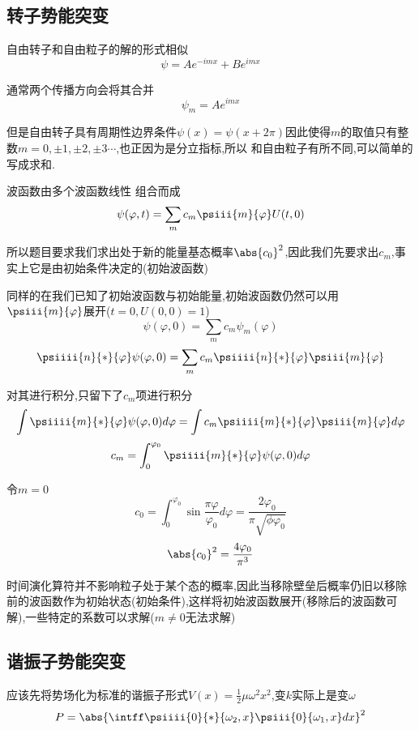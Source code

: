         \subsection{转子势能突变}
            自由转子和自由粒子的解的形式相似
            $$ \psi = A e^{-imx} + Be^{imx} $$
            
            通常两个传播方向会将其合并
            $$ \psi_{m} = A e^{imx} $$ 

            但是自由转子具有周期性边界条件$ \psi(x) = \psi(x+2\pi) $因此使得$m$的取值只有整数$ m = 0,\pm{1},\pm{2},\pm{3}\cdots $,也正因为是分立指标,所以
            和自由粒子有所不同,可以简单的写成求和.
            
            波函数由多个波函数线性
            组合而成
            $$ \psi(\varphi,t) = \sum_{m} c_{m} \psiii{m}{\varphi} U(t,0 ) $$

            所以题目要求我们求出处于新的能量基态概率$\abs{c_{0}}^{2}$,因此我们先要求出$c_{m}$,事实上它是由初始条件决定的(初始波函数)

            同样的在我们已知了初始波函数与初始能量,初始波函数仍然可以用$\psiii{m}{\varphi}$展开($t=0,U(0,0)=1$)
            $$ \psi(\varphi,0) = \sum_{m} c_{m} \psi_{m}(\varphi) $$
            $$ \psiiii{n}{*}{\varphi} \psi(\varphi,0) = \sum_{m} c_{m} \psiiii{n}{*}{\varphi} \psiii{m}{\varphi} $$

            对其进行积分,只留下了$c_{m}$项进行积分
            $$ \int \psiiii{m}{*}{\varphi} \psi(\varphi,0) d\varphi = \int c_{m} \psiiii{m}{*}{\varphi} \psiii{m}{\varphi} d\varphi $$
            $$ c_{m} =  \int_{0}^{\varphi_0} \psiiii{m}{*}{\varphi} \psi(\varphi,0) d\varphi$$
            
            令$m=0$
            $$ c_{0} = \int_{0}^{\varphi_0} \sin{\frac{\pi \varphi}{\varphi_{0}}} d\varphi  = \frac{2\varphi_{0}}{\pi \sqrt{\phi \varphi_{0}}} $$
            $$ \abs{c_{0}}^{2} = \frac{4 \varphi_{0}}{\pi^{3}}  $$

            时间演化算符并不影响粒子处于某个态的概率,因此当移除壁垒后概率仍旧以移除前的波函数作为初始状态(初始条件),这样将初始波函数展开(移除后的波函数可解),一些特定的系数可以求解($m\neq0$无法求解)

        \subsection{谐振子势能突变}
            应该先将势场化为标准的谐振子形式$ V(x) = \frac{1}{2} \mu \omega ^{2} x^{2} $,变$k$实际上是变$\omega$
            $$ P = \abs{\intff \psiiii{0}{*}{\omega_{2},x} \psiii{0}{\omega_{1},x} dx }^{2} $$
            
